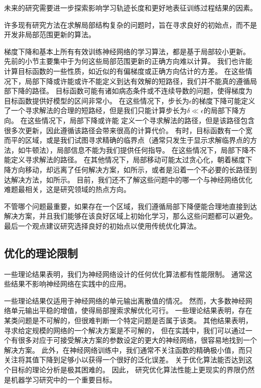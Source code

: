 
未来的研究需要进一步探索影响学习轨迹长度和更好地表征训练过程结果的因素。

许多现有研究方法在求解局部结构复杂的问题时，旨在寻求良好的初始点，而不是开发非局部范围更新的算法。

梯度下降和基本上所有有效训练神经网络的学习算法，都是基于局部较小更新。
先前的小节主要集中于为何这些局部范围更新的正确方向难以计算。
我们也许能计算目标函数的一些性质，如近似的有偏梯度或正确方向估计的方差。
在这些情况下，局部下降或许能或许不能定义到达有效解的短路径，我们并不能真的遵循局部下降的路径。
目标函数可能有诸如病态条件或不连续导数的问题，使得梯度为目标函数提供好模型的区间非常小。
在这些情况下，步长为$\epsilon$的梯度下降可能定义了一个寻求解法的合理的短路经，但是我们只能计算步长为$\delta \ll \epsilon$的局部下降方向。
在这些情况下，局部下降或许能 定义一个寻求解法的路径，但是该路径包含很多次更新，因此遵循该路径会带来很高的计算代价。
有时，目标函数有一个宽而平的区域，或是我们试图寻求精确的临界点（通常只发生于显示求解临界点的方法，如牛顿法），局部信息不能为我们提供任何指导。
在这些情况下，局部下降不能定义寻求解法的路径。
在其他情况下，局部移动可能太过贪心化，朝着梯度下降方向移动，却远离了任何解决方案，如所示，或者是沿着一个不必要的长路径到达解决方法，如所示。
目前，我们还不了解这些问题中的哪一个与神经网络优化难题最相关，这是研究领域的热点方向。


不管哪个问题最重要，如果存在一个区域，我们遵循局部下降便能合理地直接到达解决方案，并且我们能够在该良好区域上初始化学习，那么这些问题都可以避免。
最后一个观点建议研究选择良好的初始点以使用传统优化算法。

\subsection{优化的理论限制}
\label{sec:theoretical_limits_of_optimization}
一些理论结果表明，我们为神经网络设计的任何优化算法都有性能限制\citep{Blum92,JuddBook,wolpert96no}。
通常这些结果不影响神经网络在实践中的应用。

一些理论结果仅适用于神经网络的单元输出离散值的情况。
然而，大多数神经网络单元输出平稳的增值，使得局部搜索求解优化可行。
一些理论结果表明，存在某类问题是不可解的，但很难判断一个特定问题是否属于该类。
其他结果表明，寻求给定规模的网络的一个解决方案是不可解的，
但在实践中，我们可以通过一个有很多对应于可接受解决方案的参数设定的更大的神经网络，很容易地找到一个解决方案。
此外，在神经网络训练中，我们通常不关注函数的精确极小值，而只关注将其值下降到足够小以获得一个很好的泛化误差。
关于优化算法能否达到这个目标的理论分析是极其困难的。
因此， 研究优化算法性能上更现实的界限仍然是机器学习研究中的一个重要目标。

